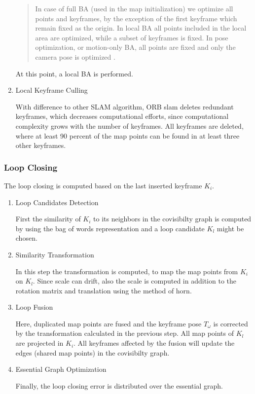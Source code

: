 \begin{enumerate}
	\begin{quote}
	In case of full BA
	(used in the map initialization) we optimize
	all points and keyframes, by the exception of the first
	keyframe which remain fixed as the origin. In local BA
	all points included in the local area
	are optimized, while a subset of keyframes is fixed. In
	pose optimization, or motion-only BA, all
	points are fixed and only the camera pose is optimized \cite{orb} .
	\end{quote}
	At this point, a local BA is performed.
	
	\item{Local Keyframe Culling}
	
	With difference to other SLAM algorithm, ORB slam deletes redundant 
	keyframes, which decreases computational efforts, since computational
	complexity grows with the number of keyframes. All keyframes are deleted, 
	where at least 90 percent of the map points can be found in at least three other 
	keyframes. 
	
	
	\end{enumerate}
	
	\subsubsection{Loop Closing}
	
	The loop closing is computed based on the last inserted keyframe $K_i$. 
	
	\begin{enumerate}
	\item{Loop Candidates Detection}
	
	First the similarity of $K_i$ to its neighbors in the covisibilty
	graph is computed by using the bag of words representation and a 
	loop candidate $K_l$ might be chosen. 
	
	\item{Similarity Transformation}
	
	In this step the transformation is computed, to map the map points
	from $K_i$ on $K_l$. Since scale can drift, also the scale is computed
	in addition to the rotation matrix and translation using the method of horn. 
	
	
	\item{Loop Fusion}
	
	Here, duplicated map points are fused and the keyframe pose $T_\omega$ is corrected by the transformation
	calculated in the previous step. All map points of $K_l$ are projected in $K_i$. 
	All keyframes affected by the fusion will update the edges (shared map points) in the 
	covisibilty graph. 
	
	\item{ Essential Graph Optimization}
	
	Finally, the loop closing error is distributed over the essential graph. 
	
	
	\end{enumerate}
	
